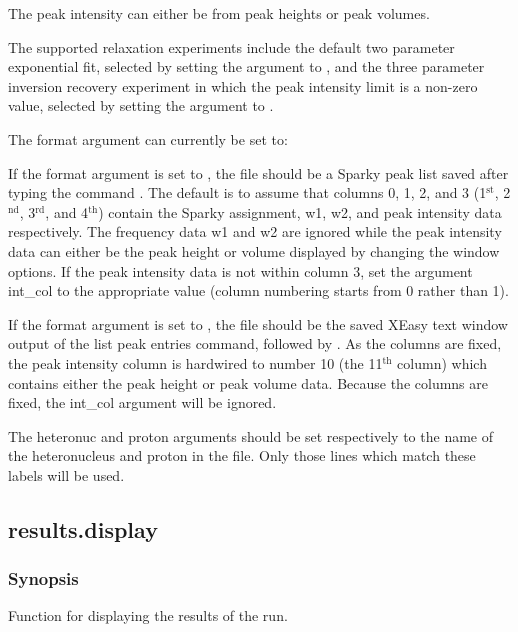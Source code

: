 The peak intensity can either be from peak heights or peak volumes.


The supported relaxation experiments include the default two parameter exponential fit,
selected by setting the 
 argument to 
, and the three parameter inversion
recovery experiment in which the peak intensity limit is a non-zero value, selected by
setting the argument to 
.


The format argument can currently be set to:
    

    


If the format argument is set to 
, the file should be a Sparky peak list saved after
typing the command 
.  The default is to assume that columns 0, 1, 2, and 3 (1$^\mathrm{st}$, 2$^\mathrm{nd}$,
3$^\mathrm{rd}$, and 4$^\mathrm{th}$) contain the Sparky assignment, w1, w2, and peak intensity data respectively.
The frequency data w1 and w2 are ignored while the peak intensity data can either be the
peak height or volume displayed by changing the window options.  If the peak intensity data
is not within column 3, set the argument int\_col to the appropriate value (column numbering
starts from 0 rather than 1).

If the format argument is set to 
, the file should be the saved XEasy text window
output of the list peak entries command, 
 followed by 
.  As the columns are fixed,
the peak intensity column is hardwired to number 10 (the 11$^\mathrm{th}$ column) which contains either
the peak height or peak volume data.  Because the columns are fixed, the int\_col argument
will be ignored.


The heteronuc and proton arguments should be set respectively to the name of the
heteronucleus and proton in the file.  Only those lines which match these labels will be
used.


\newpage

\subsection{results.display}


\subsubsection{Synopsis}

Function for displaying the results of the run.

